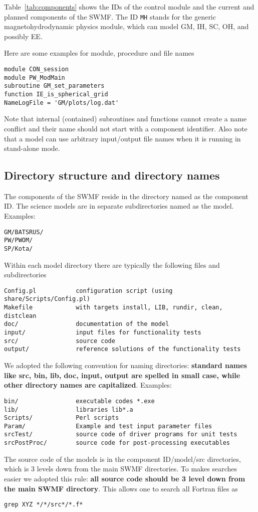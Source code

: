 \documentclass{article}
\begin{document}
\bigskip

Table~\ref{tab:components} shows the IDs of the control module and the
current and planned components of the SWMF.
The ID {\tt MH} stands for the generic magnetohydrodynamic
physics module, which can model GM, IH, SC, OH, and possibly EE.

Here are some examples for module, procedure and file names
\begin{verbatim}
module CON_session
module PW_ModMain
subroutine GM_set_parameters
function IE_is_spherical_grid
NameLogFile = 'GM/plots/log.dat'
\end{verbatim}
Note that internal (contained) subroutines and functions cannot create
a name conflict and their name should not start with a component identifier. 
Also note that a model can use arbitrary input/output 
file names when it is running in stand-alone mode.

\subsection{Directory structure and directory names}

The components of the SWMF reside in the directory named as the component ID.
The science models are in separate subdirectories named as the model.
Examples:
\begin{verbatim}
GM/BATSRUS/
PW/PWOM/
SP/Kota/
\end{verbatim}
Within each model directory there are typically the following files 
and subdirectories
\begin{verbatim}
Config.pl           configuration script (using share/Scripts/Config.pl)
Makefile            with targets install, LIB, rundir, clean, distclean
doc/                documentation of the model
input/              input files for functionality tests
src/                source code
output/             reference solutions of the functionality tests
\end{verbatim}
We adopted the following convention for naming directories:
{\bf standard names like src, bin, lib, doc, input, output are spelled
in small case, while other directory names are capitalized}. Examples:
\begin{verbatim}
bin/                executable codes *.exe
lib/                libraries lib*.a
Scripts/            Perl scripts
Param/              Example and test input parameter files
srcTest/            source code of driver programs for unit tests
srcPostProc/        source code for post-processing executables
\end{verbatim}
The source code of the models is in the component ID/model/src directories,
which is 3 levels down from the main SWMF directories. To makes searches 
easier we adopted this rule: {\bf all source code should be 3 level down from
the main SWMF directory}. This allows one to search all Fortran files as
\begin{verbatim}
grep XYZ */*/src*/*.f*
\end{verbatim}
\end{document}
